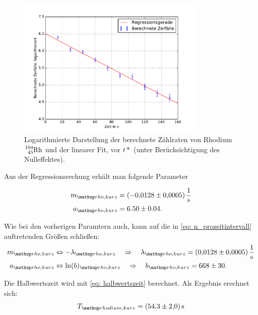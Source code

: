 \begin{figure}
  \centering
  \includegraphics[width=0.8\textwidth]{pics/rhodium_kurz_berechnet.pdf}
  \caption{Logarithmierte Darstellung der berechnete Zählraten von Rhodium $\ce{^{104}_{45} Rh}$ und der linearer Fit, vor $t*$ (unter Berücksichtigung des Nulleffektes).}
  \label{fig: plot_rhodium_kurz}
\end{figure}


Aus der Regressionsrechung erhält man folgende Parameter

\begin{align}
  \label{eq:parameter_rhodium_kurz}
  \begin{aligned}
    m\ua{rho,kurz}&=\SI{-0.0128\pm0.0005}{\per\second}\\
    a\ua{rho,kurz}&=6.50\pm0.04.
  \end{aligned}
\end{align}

Wie bei den vorherigen Paramtern auch, kann auf die in \eqref{eq: n_prozeitintervall} auftretenden Größen %
schließen: %
\begin{align}
  \label{eq:parameter_rhodium_kurz_lambda}
  \begin{aligned}
    m\ua{rho,kurz}&\Leftrightarrow -\lambda\ua{rho,kurz} \quad \Rightarrow \quad \lambda\ua{rho,kurz}=\SI{0.0128\pm0.0005}{\per\second}\\
    a\ua{rho,kurz}&\Leftrightarrow \ln(b)\ua{rho,kurz} \quad \Rightarrow \quad b\ua{rho,kurz} =668\pm 30.
  \end{aligned}
\end{align}

Die Halbwertszeit wird mit \eqref{eq: halbwertszeit} berechnet.
Als Ergebnis erechnet sich:
\begin{equation}
  \label{eq:halbwertzeit_rhodium_kurz}
  T\ua{rhodium, kurz}=\SI{54.3\pm2.0 }{\second}
\end{equation}

